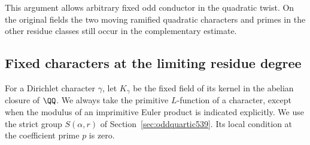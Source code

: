 \documentclass[a4paper,11pt]{article}
\theoremstyle{definition}
\theoremstyle{remark}
\numberwithin{equation}{section}
\begin{document}
This argument allows arbitrary fixed odd conductor in the
quadratic twist. On the original fields the two moving
ramified quadratic characters and primes in the other
residue classes still occur in the complementary estimate.


\subsection{Fixed characters at the limiting residue degree}
\label{sec:fixedcharacters543}

For a Dirichlet character \(\gamma\), let \(K_\gamma\) be the
fixed field of its kernel in the abelian closure of \(\QQ\).
We always take the primitive \(L\)-function of a character,
except when the modulus of an imprimitive Euler product is
indicated explicitly. We use the strict group \(S(\alpha,r)\)
of Section~\ref{sec:oddquartic539}. Its local condition at
the coefficient prime \(p\) is zero.
\end{document}
